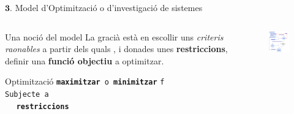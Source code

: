 \documentclass[twocolumn]{beamer}
\begin{document}
\begin{frame}{$\mathbf 3.$ Model d’Optimització o d’investigació de sistemes}
\begin{columns}[t]
\begin{column}{.5\textwidth}
	\begin{block}{Una noció del model}
		La gracià està en escollir uns \emph{criteris raonables}
		a partir dels quals , i donades unes \textbf{restriccions}, definir una \textbf{funció objectiu} a optimitzar.
	\end{block}

\begin{block}{Optimització}
\texttt{\textbf{maximitzar} o \textbf{minimitzar}} \texttt{f}
\\ 
\texttt{Subjecte a}
\\
$\quad $ \texttt{\textbf{restriccions}}
\end{block}
\end{column}
\begin{column}{.5\textwidth}
\begin{figure}
\includegraphics[width=6cm]{algor}
\end{figure}
\end{column}
\end{columns}
\end{frame}
\end{document}

